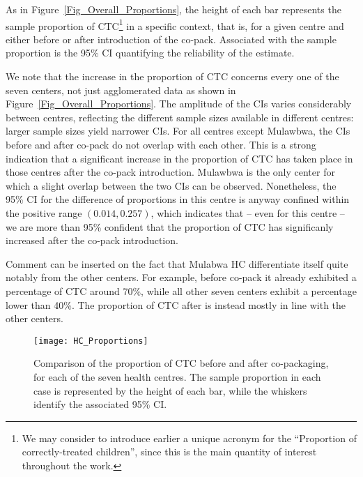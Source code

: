 \documentclass[a4paper, 12pt]{article}
\begin{document}
As in Figure~\ref{Fig_Overall_Proportions}, the height of each bar represents the sample proportion of CTC\footnote{We may consider to introduce earlier a unique acronym for the ``Proportion of correctly-treated children'', since this is the main quantity of interest throughout the work.} in a specific context, that is, for a given centre and either before or after introduction of the co-pack. Associated with the sample proportion is the 95\% CI quantifying the reliability of the estimate.

We note that the increase in the proportion of CTC concerns every one of the seven centers, 
not just agglomerated data as shown in Figure~\ref{Fig_Overall_Proportions}.
The amplitude of the CIs varies considerably between centres, reflecting the different sample sizes available in different centres: larger sample sizes yield narrower CIs. 
For all centres except Mulawbwa, the CIs before and after co-pack do not overlap with each other. This is a strong indication that a significant increase in the proportion of CTC has taken place in those centres after the co-pack introduction. Mulawbwa is the only center for which a slight overlap between the two CIs can be observed. Nonetheless, the 95\% CI for the difference of proportions in this centre is anyway confined within the positive range $(0.014, 0.257)$, which indicates that -- even for this centre -- we are more than 95\% confident that the proportion of CTC has significanly increased after the co-pack introduction.
 
 Comment can be inserted on the fact that Mulabwa HC differentiate itself quite notably from the other centers. For example, before co-pack it already exhibited a percentage of CTC around 70\%, while all other seven centers exhibit a percentage lower than 40\%. The proportion of CTC after is instead mostly in line with the other centers. 
 

\begin{figure}
\texttt{[image: HC\_Proportions]}
\caption{Comparison of the proportion of CTC before and after co-packaging, for each of the seven health centres. The sample proportion in each case is represented by the height of each bar, while the whiskers identify the associated 95\% CI.}
\label{Fig_Single_Proportions}
\end{figure}






\newpage
 
  
\end{document}
